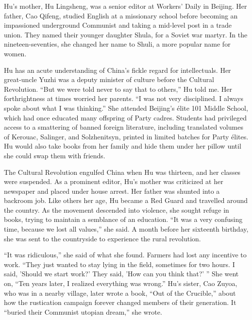 ﻿\documentclass[12pt]{article}
\begin{document}
Hu's mother, Hu Lingsheng, was a senior editor at Workers' Daily in Beijing. Her father, Cao Qifeng,
studied English at a missionary school before becoming an impassioned underground Communist and
taking a mid-level post in a trade union. They named their younger daughter Shula, for a Soviet war
martyr. In the nineteen-seventies, she changed her name to Shuli, a more popular name for women.

Hu has an acute understanding of China's fickle regard for intellectuals. Her great-uncle Yuzhi was
a deputy minister of culture before the Cultural Revolution. ``But we were told never to say that to
others,'' Hu told me. Her forthrightness at times worried her parents. ``I was not very disciplined.
I always spoke about what I was thinking.'' She attended Beijing's \'elite 101 Middle School, which
had once educated many offspring of Party cadres. Students had privileged access to a smattering of
banned foreign literature, including translated volumes of Kerouac, Salinger, and Solzhenitsyn,
printed in limited batches for Party \'elites. Hu would also take books from her family and hide
them under her pillow until she could swap them with friends.

The Cultural Revolution engulfed China when Hu was thirteen, and her classes were suspended. As a
prominent editor, Hu's mother was criticized at her newspaper and placed under house arrest. Her
father was shunted into a backroom job. Like others her age, Hu became a Red Guard and travelled
around the country. As the movement descended into violence, she sought refuge in books, trying to
maintain a semblance of an education. ``It was a very confusing time, because we lost all values,''
she said. A month before her sixteenth birthday, she was sent to the countryside to experience the
rural revolution.

``It was ridiculous,'' she said of what she found. Farmers had lost any incentive to work. ``They
just wanted to stay lying in the field, sometimes for two hours. I said, 'Should we start work?'
They said, 'How can you think that?' '' She went on, ``Ten years later, I realized everything was
wrong.'' Hu's sister, Cao Zuyoa, who was in a nearby village, later wrote a book, ``Out of the
Crucible,'' about how the rustication campaign forever changed members of their generation. It
``buried their Communist utopian dream,'' she wrote.
\end{document}
